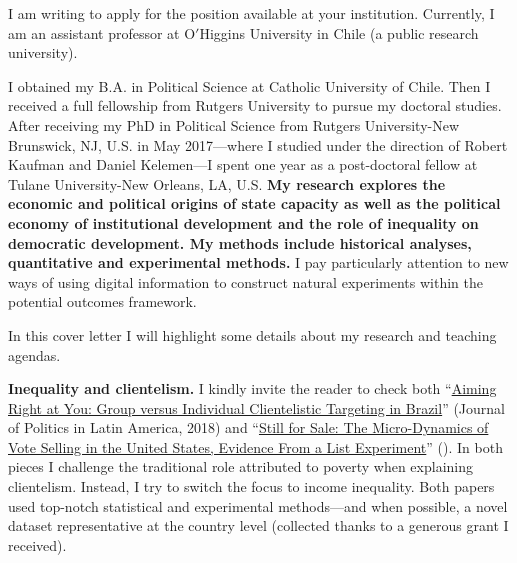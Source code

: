 \vspace{-0.3cm}I am writing to apply for the position available at your institution. Currently, I am an assistant professor at O$'$Higgins University in Chile (a public research university). %

I obtained my B.A. in Political Science at Catholic University of Chile. Then I received a full fellowship from Rutgers University to pursue my doctoral studies. After receiving my PhD in Political Science from Rutgers University-New Brunswick, NJ, U.S. in May 2017---where I studied under the direction of Robert Kaufman and Daniel Kelemen---I spent one year as a post-doctoral fellow at Tulane University-New Orleans, LA, U.S. {\bf My research explores the economic and political origins of state capacity as well as the political economy of institutional development and the role of inequality on democratic development. My methods include historical analyses, quantitative and experimental methods.} I pay particularly attention to new ways of using digital information to construct natural experiments within the potential outcomes framework. 

In this cover letter I will highlight some details about my research and teaching agendas.

{\bf Inequality and clientelism.} I kindly invite the reader to check both ``\href{https://journals.sub.uni-hamburg.de/giga/jpla/article/view/1121/1128}{Aiming Right at You: Group versus Individual Clientelistic Targeting in Brazil}'' (Journal of Politics in Latin America, 2018) and ``\href{https://doi.org/10.1057/s41269-020-00174-4}{Still for Sale: The Micro-Dynamics of Vote Selling in the United States, Evidence From a List Experiment}'' ({\unskip}). In both pieces I challenge the traditional role attributed to poverty when explaining clientelism. Instead, I try to switch the focus to income inequality. Both papers used top-notch statistical and experimental methods---and when possible, a novel dataset representative at the country level (collected thanks to a generous grant I received). 

